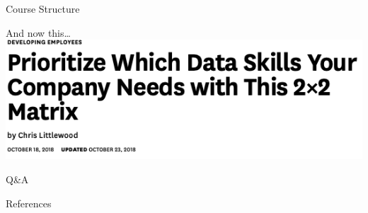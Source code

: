 \documentclass[
  ignorenonframetext,
]{beamer}
\begin{document}
\begin{frame}[fragile]{Course Structure}
\begin{block}{And now this\ldots{}}
\protect\hypertarget{and-now-this}{}
\includegraphics{../../img/ds_matrix.png}
\end{block}
\end{frame}

\begin{frame}{Q\&A}
\protect\hypertarget{qa}{}
\begin{block}{References}
\protect\hypertarget{references}{}
\end{block}
\end{frame}
\end{document}
